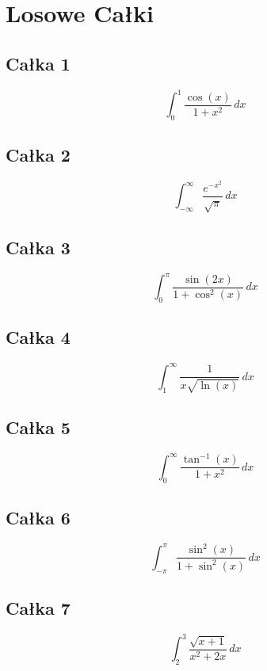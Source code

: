\documentclass{article}
\begin{document}
\section*{Losowe Całki}

\subsection*{Całka 1}
\begin{equation}
    \int_{0}^{1} \frac{\cos(x)}{1+x^2} \,dx
\end{equation}

\subsection*{Całka 2}
\begin{equation}
    \int_{-\infty}^{\infty} \frac{e^{-x^2}}{\sqrt{\pi}} \,dx
\end{equation}

\subsection*{Całka 3}
\begin{equation}
    \int_{0}^{\pi} \frac{\sin(2x)}{1 + \cos^2(x)} \,dx
\end{equation}

\subsection*{Całka 4}
\begin{equation}
    \int_{1}^{\infty} \frac{1}{x\sqrt{\ln(x)}} \,dx
\end{equation}

\subsection*{Całka 5}
\begin{equation}
    \int_{0}^{\infty} \frac{\tan^{-1}(x)}{1+x^2} \,dx
\end{equation}

\subsection*{Całka 6}
\begin{equation}
    \int_{-\pi}^{\pi} \frac{\sin^2(x)}{1 + \sin^2(x)} \,dx
\end{equation}

\subsection*{Całka 7}
\begin{equation}
    \int_{2}^{3} \frac{\sqrt{x+1}}{x^2+2x} \,dx
\end{equation}
\end{document}
